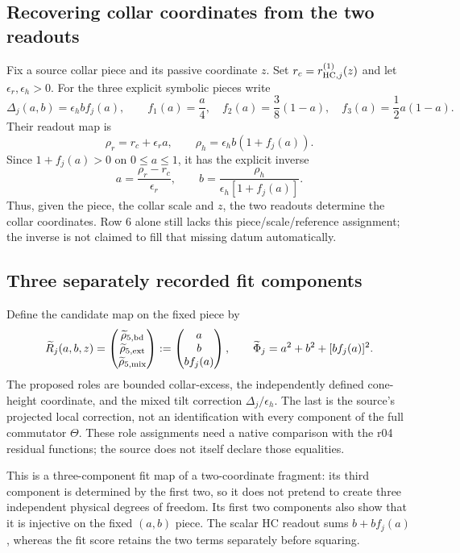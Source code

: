 \documentclass[11pt,a4paper]{article}
\begin{document}
\subsection{Recovering collar coordinates from the two readouts}
Fix a source collar piece and its passive coordinate $z$. Set
$r_c=r_{{\rm HC},j}^{(1)}(z)$ and let $\epsilon_r,\epsilon_h>0$.
For the three explicit symbolic pieces write
\[
\Delta_j(a,b)=\epsilon_h b f_j(a),\qquad
f_1(a)=\frac a4,\quad f_2(a)=\frac38(1-a),\quad
f_3(a)=\frac12a(1-a).
\]
Their readout map is
\[
\rho_r=r_c+\epsilon_r a,\qquad
\rho_h=\epsilon_h b(1+f_j(a)).
\]
Since $1+f_j(a)>0$ on $0\le a\le1$, it has the explicit inverse
\[
a=\frac{\rho_r-r_c}{\epsilon_r},\qquad
b=\frac{\rho_h}{\epsilon_h[1+f_j(a)]}.
\]
Thus, given the piece, the collar scale and $z$, the two readouts determine
the collar coordinates. Row 6 alone still lacks this piece/scale/reference
assignment; the inverse is not claimed to fill that missing datum automatically.

\subsection{Three separately recorded fit components}
Define the candidate map on the fixed piece by
\[
\widetilde R_j(a,b,z)=
\begin{pmatrix}
\widetilde\rho_{5,\rm bd}\\
\widetilde\rho_{5,\rm ext}\\
\widetilde\rho_{5,\rm mix}
\end{pmatrix}
:=
\begin{pmatrix}a\\b\\b f_j(a)\end{pmatrix},
\qquad
\widetilde\Phi_j=a^2+b^2+[b f_j(a)]^2.
\]
The proposed roles are bounded collar-excess, the independently defined
cone-height coordinate, and the mixed tilt correction $\Delta_j/\epsilon_h$.
The last is the source's projected local correction, not an identification
with every component of the full commutator $\Theta$.
These role assignments need a native comparison with the r04 residual
functions; the source does not itself declare those equalities.

This is a three-component fit map of a two-coordinate fragment: its third
component is determined by the first two, so it does not pretend to create
three independent physical degrees of freedom. Its first two components
also show that it is injective on the fixed $(a,b)$ piece. The scalar
HC readout sums $b+bf_j(a)$, whereas the fit score retains the two terms
separately before squaring.
\end{document}

